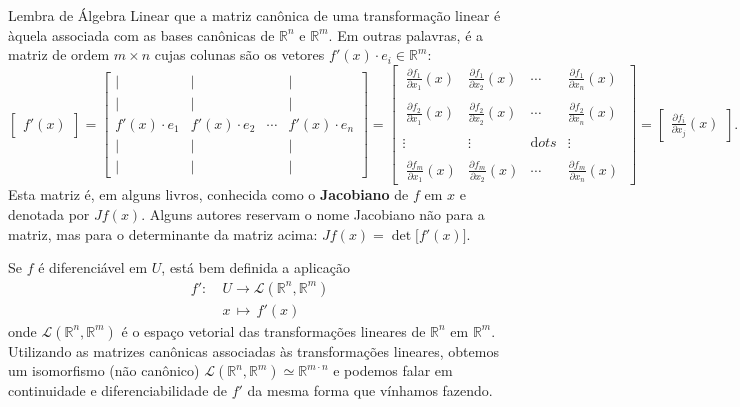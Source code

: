 Lembra de Álgebra Linear que a matriz canônica de uma transformação linear é àquela associada com as bases canônicas de $\mathbb{R}^n$ e $\mathbb{R}^m$. Em outras palavras, é a matriz de ordem $m\times n$ cujas colunas são os vetores $f'(x) \cdot e_i \in \mathbb{R}^m$:
\[
\begin{bmatrix}
f'(x)
\end{bmatrix} = 
\begin{bmatrix}
|  &  |  &   &  |  \\
|  &  |  &   &  |  \\
f'(x) \cdot e_1 & f'(x) \cdot e_2 & \cdots & f'(x) \cdot e_n \\
|  &  |  &   &  | \\
|  &  |  &   &  | 
\end{bmatrix} = 
\begin{bmatrix}
\ \frac{\partial f_1}{\partial x_1} (x) & \frac{\partial f_1}{\partial x_2} (x) & \cdots & \frac{\partial f_1}{\partial x_n} (x)\ \\ 
&&& \\
\ \frac{\partial f_2}{\partial x_1} (x) & \frac{\partial f_2}{\partial x_2} (x) & \cdots & \frac{\partial f_2}{\partial x_n} (x)\ \\ 
&&& \\
\vdots   & \vdots   & \mathrm{d} ots   & \vdots   \\
&&& \\
\ \frac{\partial f_m}{\partial x_1} (x) & \frac{\partial f_m}{\partial x_2} (x) & \cdots & \frac{\partial f_m}{\partial x_n} (x) \
\end{bmatrix} = 
\begin{bmatrix}
\frac{\partial f_i}{\partial x_j} (x)
\end{bmatrix}.
\] Esta matriz é, em alguns livros, conhecida como o \textbf{Jacobiano} de $f$ em $x$ e denotada por $Jf(x)$. Alguns autores reservam o nome Jacobiano não para a matriz, mas para o determinante da matriz acima: $Jf(x) = \det \big[f'(x)\big]$.

Se $f$ é diferenciável em $U$, está bem definida a aplicação
\[
\begin{split}
f': & \ U \to \mathcal{L}(\mathbb{R}^n, \mathbb{R}^m) \\
& \ x \, \mapsto \,  f'(x)
\end{split}
\] onde $\mathcal{L}(\mathbb{R}^n, \mathbb{R}^m)$ é o espaço vetorial das transformações lineares de $\mathbb{R}^n$ em $\mathbb{R}^m$. Utilizando as matrizes canônicas associadas às transformações lineares, obtemos um isomorfismo (não canônico) $\mathcal{L}(\mathbb{R}^n, \mathbb{R}^m) \simeq \mathbb{R}^{m\cdot n}$ e podemos falar em continuidade e diferenciabilidade de $f'$ da mesma forma que vínhamos fazendo.

